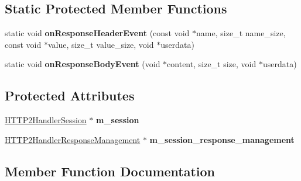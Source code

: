 \subsection*{Static Protected Member Functions}
\begin{DoxyCompactItemize}
\item 
\mbox{\label{classNetwork_1_1HTTP2_1_1NgHTTP2MultiplexHandler_a7b285c14acbc9d1afdc3b6fa39d2ba66}} 
static void {\bfseries on\+Response\+Header\+Event} (const void $\ast$name, size\+\_\+t name\+\_\+size, const void $\ast$value, size\+\_\+t value\+\_\+size, void $\ast$userdata)
\item 
\mbox{\label{classNetwork_1_1HTTP2_1_1NgHTTP2MultiplexHandler_a4c1e15026f66931b58db5edaa299981c}} 
static void {\bfseries on\+Response\+Body\+Event} (void $\ast$content, size\+\_\+t size, void $\ast$userdata)
\end{DoxyCompactItemize}
\subsection*{Protected Attributes}
\begin{DoxyCompactItemize}
\item 
\mbox{\label{classNetwork_1_1HTTP2_1_1NgHTTP2MultiplexHandler_acf4274648cd3c85bbd4fe65e1dffa01f}} 
\hyperlink{structNetwork_1_1HTTP2_1_1HTTP2HandlerSession}{H\+T\+T\+P2\+Handler\+Session} $\ast$ {\bfseries m\+\_\+session}
\item 
\mbox{\label{classNetwork_1_1HTTP2_1_1NgHTTP2MultiplexHandler_a8aae36038830c947075fb97d29895b2f}} 
\hyperlink{structNetwork_1_1HTTP2_1_1HTTP2HandlerResponseManagement}{H\+T\+T\+P2\+Handler\+Response\+Management} $\ast$ {\bfseries m\+\_\+session\+\_\+response\+\_\+management}
\end{DoxyCompactItemize}


\subsection{Member Function Documentation}
\mbox{\label{classNetwork_1_1HTTP2_1_1NgHTTP2MultiplexHandler_a084530d95344321d1d1a3765e18d2eff}} 
